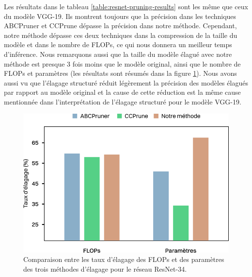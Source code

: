 Les résultats dans le tableau \ref{table:resnet-pruning-results} sont les même que ceux du modèle
VGG-19. Ils montrent toujours que la précision dans les techniques ABCPruner et CCPrune dépasse la précision dans notre méthode. Cependant, notre méthode dépasse ces deux techniques dans la compression de la taille du modèle et dans le nombre de FLOPs, ce qui nous donnera un meilleur temps d'inférence. Nous remarquons aussi que la taille du modèle élagué avec notre méthode est presque 3 fois moins que le modèle original, ainsi que le nombre de FLOPs et paramètres (les résultats sont résumés dans la figure \ref{fig:resnet-pruning}). Nous avons aussi vu que l'élagage structuré réduit légèrement la précision des modèles élagués par rapport au modèle original et la cause de cette réduction est la même cause mentionnée dans l’interprétation de l’élagage structuré pour le modèle VGG-19.

\begin{figure}[hbt!]
  \centering
  \includegraphics[width=14cm]{images_pfe/resnet-pruning.png}
  \caption{Comparaison entre les taux d'élagage des FLOPs et des paramètres des trois méthodes d'élagage pour le réseau ResNet-34.}
  \label{fig:resnet-pruning}
\end{figure}
\FloatBarrier
\medskip

